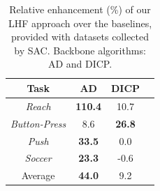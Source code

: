 \documentclass{article}
\begin{document}



\begin{table}[ht]
    \caption{Relative enhancement (\%) of our LHF approach over the baselines, provided with datasets collected by SAC. Backbone algorithms: AD and DICP.}
    \label{tab_sac_source_rl}
    \centering
    \begin{tabular}{cccc}
    \toprule
    Task & AD & DICP \\
    \midrule
     \textit{Reach} & \textbf{110.4} & 10.7 \\
     \textit{Button-Press} & 8.6 & \textbf{26.8} \\
     \textit{Push} & \textbf{33.5} & 0.0 \\
     \textit{Soccer} & \textbf{23.3} & -0.6 \\
     \midrule
     Average & \textbf{44.0} & 9.2 \\
    \bottomrule
    \end{tabular}
\end{table}
\end{document}
